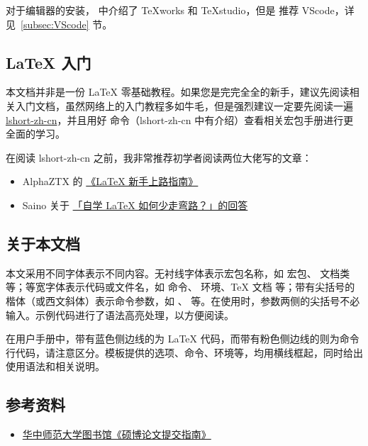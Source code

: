 对于编辑器的安装， 中介绍了 TeXworks 和 \TeX studio，但是  推荐 VScode，详见~\ref{subsec:VScode} 节。



\subsection{\LaTeX{} 入门}

本文档并非是一份 \LaTeX{} 零基础教程。如果您是完完全全的新手，建议先阅读相关入门文档，虽然网络上的入门教程多如牛毛，但是强烈建议一定要先阅读一遍 \href{https://ctan.math.illinois.edu/info/lshort/chinese/lshort-zh-cn.pdf}{lshort-zh-cn}，并且用好  命令（lshort-zh-cn 中有介绍）查看相关宏包手册进行更全面的学习。

在阅读 lshort-zh-cn 之前，我非常推荐初学者阅读两位大佬写的文章：
\begin{itemize}
  \item AlphaZTX 的 \href{https://zhuanlan.zhihu.com/p/433710726}{《LaTeX 新手上路指南》}
  \item Saino 关于 \href{https://www.zhihu.com/question/30620276/answer/2653842413}{「自学 LaTeX 如何少走弯路？」的回答}
\end{itemize}


\subsection{关于本文档} \label{subsec:提issues}

本文采用不同字体表示不同内容。无衬线字体表示宏包名称，如
 宏包、 文档类等；等宽字体表示代码或文件名，如  命令、 环境、\TeX{} 文档 等；带有尖括号的楷体（或西文斜体）表示命令参数，如 、 等。在使用时，参数两侧的尖括号不必输入。示例代码进行了语法高亮处理，以方便阅读。

在用户手册中，带有蓝色侧边线的为 \LaTeX{} 代码，而带有粉色侧边线的则为命令行代码，请注意区分。模板提供的选项、命令、环境等，均用横线框起，同时给出使用语法和相关说明。



\subsection{参考资料}

\begin{itemize}
  \item \href{https://lib.ccnu.edu.cn/fwzn/sblwtj.htm}{华中师范大学图书馆《硕博论文提交指南》}
\end{itemize}